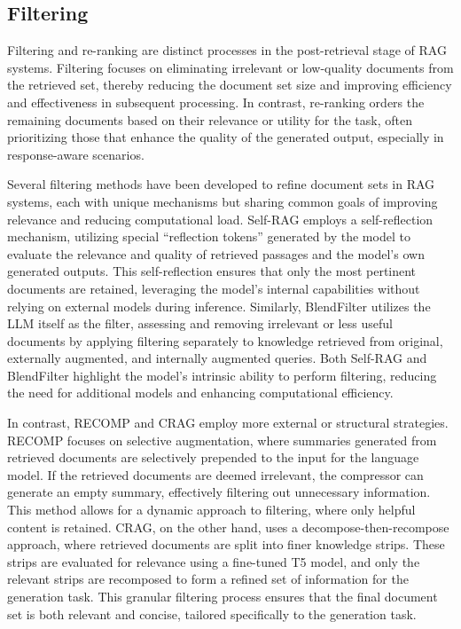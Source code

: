 \subsection{Filtering}
Filtering and re-ranking are distinct processes in the post-retrieval stage of RAG systems. Filtering focuses on eliminating irrelevant or low-quality documents from the retrieved set, thereby reducing the document set size and improving efficiency and effectiveness in subsequent processing. In contrast, re-ranking orders the remaining documents based on their relevance or utility for the task, often prioritizing those that enhance the quality of the generated output, especially in response-aware scenarios.

Several filtering methods have been developed to refine document sets in RAG systems, each with unique mechanisms but sharing common goals of improving relevance and reducing computational load. Self-RAG \cite{asai2024selfrag} employs a self-reflection mechanism, utilizing special ``reflection tokens'' generated by the model to evaluate the relevance and quality of retrieved passages and the model's own generated outputs. This self-reflection ensures that only the most pertinent documents are retained, leveraging the model's internal capabilities without relying on external models during inference. Similarly, BlendFilter \cite{wang2024blendfilter} utilizes the LLM itself as the filter, assessing and removing irrelevant or less useful documents by applying filtering separately to knowledge retrieved from original, externally augmented, and internally augmented queries. Both Self-RAG and BlendFilter highlight the model's intrinsic ability to perform filtering, reducing the need for additional models and enhancing computational efficiency.

In contrast, RECOMP \cite{xu2024recomp} and CRAG \cite{yan2024corrective} employ more external or structural strategies. RECOMP focuses on selective augmentation, where summaries generated from retrieved documents are selectively prepended to the input for the language model. If the retrieved documents are deemed irrelevant, the compressor can generate an empty summary, effectively filtering out unnecessary information. This method allows for a dynamic approach to filtering, where only helpful content is retained. CRAG, on the other hand, uses a decompose-then-recompose approach, where retrieved documents are split into finer knowledge strips. These strips are evaluated for relevance using a fine-tuned T5 model, and only the relevant strips are recomposed to form a refined set of information for the generation task. This granular filtering process ensures that the final document set is both relevant and concise, tailored specifically to the generation task.

